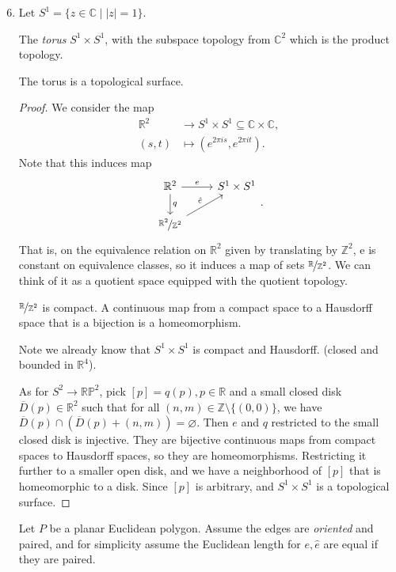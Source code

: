 \begin{enumerate}
    \setcounter{enumi}{5}
    \item Let \(S^1 = \{z \in \mathbb{C}\mid \left\vert z \right\vert =1\}\).
    
    The \textit{torus} \(S^1 \times S^1\), with the subspace topology from \(\mathbb{C}^2\) which is the product topology.
    \begin{lemma}
        The torus is a topological surface.
    \end{lemma}
    \begin{proof}
        We consider the map
        \begin{align*}
            \mathbb{R}^2 &\to S^1 \times S^1 \subseteq \mathbb{C}\times \mathbb{C},\\
            (s,t) &\mapsto (e^{2\pi is},e^{2\pi it}).
        \end{align*}
        Note that this induces map
        \[
            \begin{tikzcd}
                \mathbb{R}^2 \arrow[d,"q"] \arrow[r, "e"] & S^1\times S^1 \\ \nicefrac{\mathbb{R}^2}{\mathbb{Z}^2} \arrow[ru, "\hat{e}"]& 
            \end{tikzcd}.
        \]
        That is, on the equivalence relation on \(\mathbb{R}^2\) given by translating by \(\mathbb{Z}^2\), e is constant on equivalence classes, so it induces a map of sets \(\nicefrac{\mathbb{R}}{\mathbb{Z}^2}\). We can think of it as a quotient space equipped with the quotient topology.

        \(\nicefrac{\mathbb{R}}{\mathbb{Z}^2}\) is compact. A continuous map from a compact space to a Hausdorff space that is a bijection is a homeomorphism.

        Note we already know that \(S^1 \times S^1\) is compact and Hausdorff. (closed and bounded in \(\mathbb{R}^4\)).

        As for \(S^2 \to \mathbb{RP}^2\), pick \([p] = q(p), p \in \mathbb{R}\) and a small closed disk \(\overline{D}(p)\in \mathbb{R}^2\) such that for all \((n,m)\in \mathbb{Z}\setminus \{(0,0)\}\), we have \(\overline{D}(p)\cap (\overline{D}(p) + (n,m))=\varnothing \). Then \(e\) and \(q\) restricted to the small closed disk is injective. They are bijective continuous maps from compact spaces to Hausdorff spaces, so they are homeomorphisms. Restricting it further to a smaller open disk, and we have a neighborhood of \([p]\) that is homeomorphic to a disk. Since \([p]\) is arbitrary, and \(S^1 \times S^1\) is a topological surface.
    \end{proof}
    Let \(P\) be a planar Euclidean polygon. Assume the edges are \textit{oriented} and paired, and for simplicity assume the Euclidean length for \(e, \hat{e}\) are equal if they are paired.


\end{enumerate}
